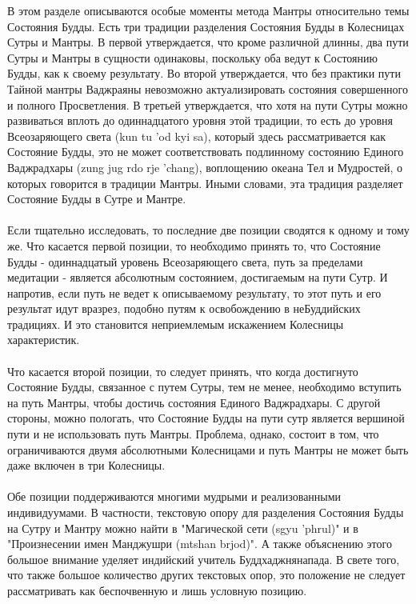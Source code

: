 \begin{siderules}
В этом разделе описываются особые моменты метода Мантры относительно темы Состояния
Будды. Есть три традиции разделения Состояния Будды в Колесницах Сутры и Мантры. В
первой утверждается, что кроме различной длинны, два пути Сутры и Мантры в сущности
одинаковы, поскольку оба ведут к Состоянию Будды, как к своему результату. Во второй
утверждается, что без практики пути Тайной мантры Ваджраяны невозможно
актуализировать состояния совершенного и полного Просветления. В третьей утверждается,
что хотя на пути Сутры можно развиваться вплоть до одиннадцатого уровня этой традиции,
то есть до уровня Всеозаряющего света (kun tu 'od kyi sa), который здесь рассматривается как
Состояние Будды, это не может соответствовать подлинному состоянию Единого
Ваджрадхары (zung jug rdo rje 'chang), воплощению океана Тел и Мудростей, о которых
говорится в традиции Мантры. Иными словами, эта традиция разделяет Состояние Будды в
Сутре и Мантре.\\
\\
Если тщательно исследовать, то последние две позиции сводятся к одному и тому же. Что
касается первой позиции, то необходимо принять то, что Состояние Будды - одиннадцатый
уровень Всеозаряющего света, путь за пределами медитации - является абсолютным
состоянием, достигаемым на пути Сутр. И напротив, если путь не ведет к описываемому
результату, то этот путь и его результат идут вразрез, подобно путям к освобождению в
неБуддийских традициях. И это становится неприемлемым искажением Колесницы
характеристик.\\
\\
Что касается второй позиции, то следует принять, что когда достигнуто Состояние Будды,
связанное с путем Сутры, тем не менее, необходимо вступить на путь Мантры, чтобы
достичь состояния Единого Ваджрадхары. С другой стороны, можно пологать, что
Состояние Будды на пути сутр является вершиной пути и не использовать путь Мантры.
Проблема, однако, состоит в том, что ограничиваются двумя абсолютными Колесницами и
путь Мантры не может быть даже включен в три Колесницы.\\
\\
Обе позиции поддерживаются многими мудрыми и реализованными индивидуумами. В
частности, текстовую опору для разделения Состояния Будды на Сутру и Мантру можно
найти в "Магической сети (sgyu 'phrul)" и в "Произнесении имен Манджушри (mtshan brjod)".
А также объяснению этого большое внимание уделяет индийский учитель
Буддхаджнянапада. В свете того, что также большое количество других текстовых опор, это
положение не следует рассматривать как беспочвенную и лишь условную позицию.
\end{siderules}

